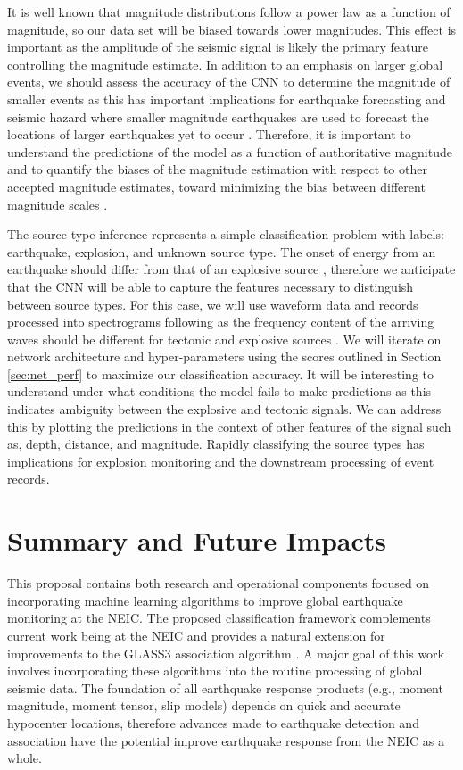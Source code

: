 \documentclass[12p]{article}
\begin{document}
It is well known that magnitude distributions follow a power law as a function of magnitude, so our data set
will be biased towards lower magnitudes. This effect is important as the amplitude of the seismic signal is likely the
primary feature controlling the magnitude estimate. In addition to an emphasis on larger global events, we should assess
the accuracy of the CNN to determine the magnitude of smaller events as this has important implications for earthquake
forecasting and seismic hazard where smaller magnitude earthquakes are used to forecast the locations of larger
earthquakes yet to occur \citep{Werner2011}. Therefore, it is important to understand the predictions of the model
as a function of authoritative magnitude and to quantify the biases of the magnitude estimation with respect
to other accepted magnitude estimates, toward minimizing the bias between different magnitude
scales \citep{Scordillis2006}.

The source type inference represents a simple classification problem with labels: earthquake, explosion, and unknown
source type. The onset of energy from an earthquake should differ from that of an explosive source \citep{Evernden1969,
Douglas2002}, therefore we anticipate that the CNN will be able to capture the features necessary to distinguish between
source types. For this case, we will use waveform data and records processed into spectrograms following
\citet{Zhu2019b} as the frequency content of the arriving waves should be different for tectonic and explosive sources
\citep{Evernden1969}. We will iterate on network architecture and hyper-parameters using the scores outlined in Section
\ref{sec:net_perf} to maximize our classification accuracy. It will be interesting to understand under what conditions
the model fails to make predictions as this indicates ambiguity between the explosive and tectonic signals. We can
address this by plotting the predictions in the context of other features of the signal such as, depth, distance, and
magnitude. Rapidly classifying the source types has implications for explosion monitoring and the downstream processing
of event records.

\section{Summary and Future Impacts}
This proposal contains both research and operational components focused on incorporating machine learning algorithms to
improve global earthquake monitoring at the NEIC. The proposed classification framework complements current work being
at the NEIC and provides a natural extension for improvements to the GLASS3 association algorithm \citep{Yeck2019}. A
major goal of this work involves incorporating these algorithms into the routine processing of global seismic data. The
foundation of all earthquake response products (e.g., moment magnitude, moment tensor, slip models) depends on quick and
accurate hypocenter locations, therefore advances made to earthquake detection and association have the potential
improve earthquake response from the NEIC as a whole.
\end{document}
